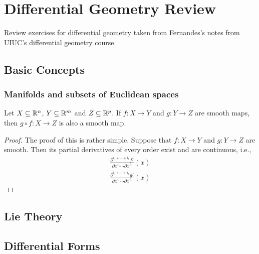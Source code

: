 \chapter{Differential Geometry Review}
Review exercises for differential geometry taken from Fernandes's notes
from UIUC's differential geometry course.
\section{Basic Concepts}
\subsection{Manifolds and subsets of Euclidean spaces}
\begin{proposition}
  Let \(X\subseteq\mathbb{R}^n\), \(Y\subseteq\mathbb{R}^m\) and
  \(Z\subseteq\mathbb{R}^p\). If \(f\colon X\to Y\) and \(g\colon Y\to Z\) are
  smooth maps, then \(g\circ f\colon X\to Z\) is also a smooth map.
\end{proposition}
\begin{proof}
  The proof of this is rather simple. Suppose that \(f\colon X\to Y\) and
  \(g\colon Y\to Z\) are smooth. Then its partial derivatives of every
  order exist and are continuous, i.e.,
  \begin{align*}
    \frac{\partial^{i_1+\dotsb+i_r}f^j}{\partial x^{i_1}\dotsm\partial
    x^{i_r}}(x)\\
     \frac{\partial^{i_1+\dotsb+i_r}g^j}{\partial x^{i_1}\dotsm\partial
    x^{i_r}}(x)
  \end{align*}
\end{proof}

\section{Lie Theory}
\section{Differential Forms}



